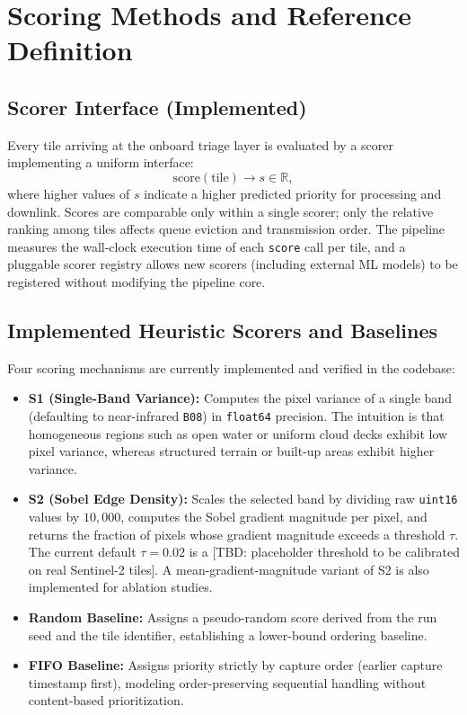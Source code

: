 \documentclass[conference]{IEEEtran}
\begin{document}
\section{Scoring Methods and Reference Definition}

\subsection{Scorer Interface (Implemented)}
Every tile arriving at the onboard triage layer is evaluated by a scorer implementing a uniform interface:
\begin{equation}
    \text{score}(\text{tile}) \rightarrow s \in \mathbb{R},
\end{equation}
where higher values of $s$ indicate a higher predicted priority for processing and downlink. Scores are comparable only within a single scorer; only the relative ranking among tiles affects queue eviction and transmission order. The pipeline measures the wall-clock execution time of each \texttt{score} call per tile, and a pluggable scorer registry allows new scorers (including external ML models) to be registered without modifying the pipeline core.

\subsection{Implemented Heuristic Scorers and Baselines}
Four scoring mechanisms are currently implemented and verified in the codebase:
\begin{itemize}
    \item \textbf{S1 (Single-Band Variance):} Computes the pixel variance of a single band (defaulting to near-infrared \texttt{B08}) in \texttt{float64} precision. The intuition is that homogeneous regions such as open water or uniform cloud decks exhibit low pixel variance, whereas structured terrain or built-up areas exhibit higher variance.
    \item \textbf{S2 (Sobel Edge Density):} Scales the selected band by dividing raw \texttt{uint16} values by $10{,}000$, computes the Sobel gradient magnitude per pixel, and returns the fraction of pixels whose gradient magnitude exceeds a threshold $\tau$. The current default $\tau = 0.02$ is a [TBD: placeholder threshold to be calibrated on real Sentinel-2 tiles]. A mean-gradient-magnitude variant of S2 is also implemented for ablation studies.
    \item \textbf{Random Baseline:} Assigns a pseudo-random score derived from the run seed and the tile identifier, establishing a lower-bound ordering baseline.
    \item \textbf{FIFO Baseline:} Assigns priority strictly by capture order (earlier capture timestamp first), modeling order-preserving sequential handling without content-based prioritization.
\end{itemize}
\end{document}
